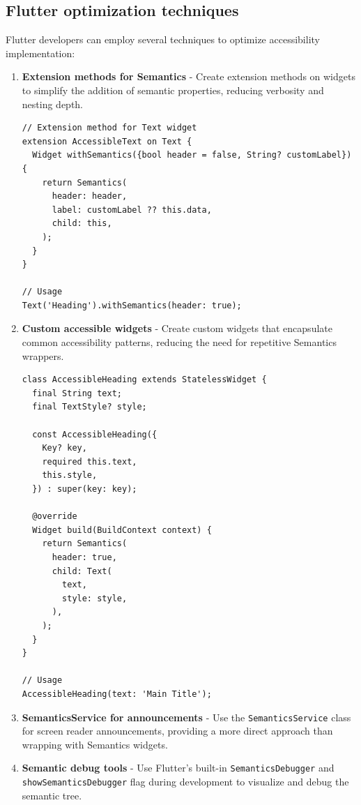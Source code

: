 \subsection{Flutter optimization techniques}
\label{subsec:flutter-optimization}

Flutter developers can employ several techniques to optimize accessibility implementation:

\begin{enumerate}
    \item \textbf{Extension methods for Semantics} - Create extension methods on widgets to simplify the addition of semantic properties, reducing verbosity and nesting depth.
    
    \begin{lstlisting}[style=DartStyle, caption=Flutter extension method for accessibility, label=lst:flutter-extension]
// Extension method for Text widget
extension AccessibleText on Text {
  Widget withSemantics({bool header = false, String? customLabel}) {
    return Semantics(
      header: header,
      label: customLabel ?? this.data,
      child: this,
    );
  }
}

// Usage
Text('Heading').withSemantics(header: true);
    \end{lstlisting}
    
    \item \textbf{Custom accessible widgets} - Create custom widgets that encapsulate common accessibility patterns, reducing the need for repetitive Semantics wrappers.
    
    \begin{lstlisting}[style=DartStyle, caption=Flutter custom accessible widget, label=lst:flutter-custom]
class AccessibleHeading extends StatelessWidget {
  final String text;
  final TextStyle? style;
  
  const AccessibleHeading({
    Key? key,
    required this.text,
    this.style,
  }) : super(key: key);
  
  @override
  Widget build(BuildContext context) {
    return Semantics(
      header: true,
      child: Text(
        text,
        style: style,
      ),
    );
  }
}

// Usage
AccessibleHeading(text: 'Main Title');
    \end{lstlisting}
    
    \item \textbf{SemanticsService for announcements} - Use the \texttt{SemanticsService} class for screen reader announcements, providing a more direct approach than wrapping with Semantics widgets.
    
    \item \textbf{Semantic debug tools} - Use Flutter's built-in \texttt{SemanticsDebugger} and \\ \texttt{showSemanticsDebugger} flag during development to visualize and debug the semantic tree.
\end{enumerate}

